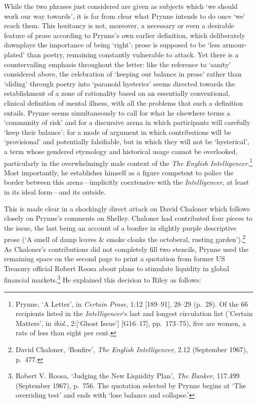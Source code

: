 \documentclass[]{article}
\begin{document}
While the two phrases just considered are given as subjects which ‘we
should work our way towards’, it is far from clear what Prynne intends
to do once ‘we’ reach them. This hesitancy is not, moreover, a necessary
or even a desirable feature of prose according to Prynne’s own earlier
definition, which deliberately downplays the importance of being
‘right’: prose is supposed to be ‘less armour-plated’ than poetry,
remaining constantly vulnerable to attack. Yet there is a countervailing
emphasis throughout the letter: like the reference to ‘sanity’
considered above, the celebration of ‘keeping our balance in prose’
rather than ‘sliding’ through poetry into ‘paranoid hysterics’ seems
directed towards the establishment of a zone of rationality based on an
essentially conventional, clinical definition of mental illness, with
all the problems that such a definition entails. Prynne seems
simultaneously to call for what he elsewhere terms a ‘community of risk’
and for a discursive arena in which participants will carefully ‘keep
their balance’; for a mode of argument in which contributions will be
‘provisional’ and potentially falsifiable, but in which they will not be
‘hysterical’, a term whose gendered etymology and historical usage
cannot be overlooked, particularly in the overwhelmingly male context of
the \emph{The English Intelligencer}.\footnote{Prynne, ‘A Letter’, in
  \emph{Certain Prose}, 1:12 {[}189–91{]}, 28–29 (p.~28). Of the 66
  recipients listed in the \emph{Intelligencer}‘s last and longest
  circulation list (’Certain Matters’, in \emph{ibid}., 2:{[}‘Ghost
  Issue’{]} {[}G16–17{]}, pp.~173–75), five are women, a rate of less
  than eight per cent.} Most importantly, he establishes himself as a
figure competent to police the border between this arena—implicitly
coextensive with the \emph{Intelligencer}, at least in its ideal
form—and its outside.

This is made clear in a shockingly direct attack on David Chaloner which
follows closely on Prynne’s comments on Shelley. Chaloner had
contributed four pieces to the issue, the last being an account of a
bonfire in slightly purple descriptive prose (‘A smell of damp leaves \&
smoke cloaks the octoberal, rusting garden’).\footnote{David Chaloner,
  ‘Bonfire’, \emph{The English Intelligencer}, 2.12 (September 1967),
  p.~477.} As Chaloner’s contributions did not completely fill two
stencils, Prynne used the remaining space on the second page to print a
quotation from former US Treasury official Robert Roosa about plans to
stimulate liquidity in global financial markets.\footnote{Robert V.
  Roosa, ‘Judging the New Liquidity Plan’, \emph{The Banker}, 117.499
  (September 1967), p.~756. The quotation selected by Prynne begins at
  ‘The overriding test’ and ends with ‘lose balance and collapse.’} He
explained this decision to Riley as follows:
\end{document}
